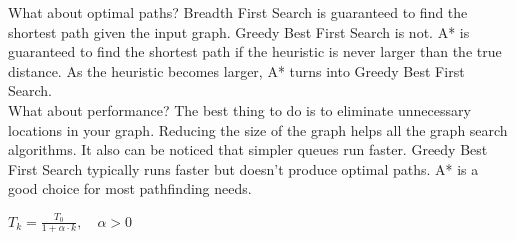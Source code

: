\documentclass[a4paper]{article}
\begin{document}
\noindent What about optimal paths? Breadth First Search is guaranteed to find the shortest path given the input graph. Greedy Best First Search is not. A* is guaranteed to find the shortest path if the heuristic is never larger than the true distance. As the heuristic becomes larger, A* turns into Greedy Best First Search.\\

\noindent What about performance? The best thing to do is to eliminate unnecessary locations in your graph. Reducing the size of the graph helps all the graph search algorithms. It also can be noticed that simpler queues run faster. Greedy Best First Search typically runs faster but doesn’t produce optimal paths. A* is a good choice for most pathfinding needs.

\newpage

$T_k = \frac{T_0}{1 + \alpha \cdot k}, \quad \alpha > 0$






\end{document}
